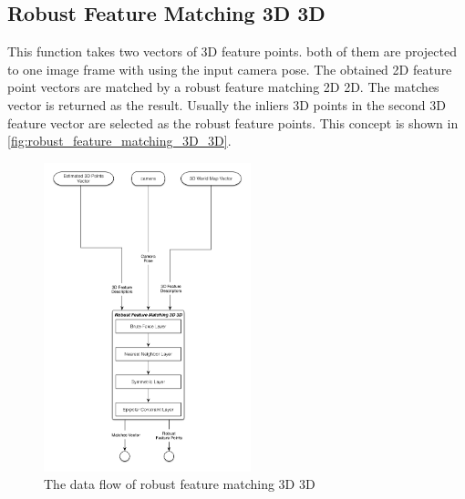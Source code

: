 \subsection {Robust Feature Matching 3D 3D} \label{subsec:robust_feature_matching_3D_3D}
This function takes two vectors of 3D feature points. both of them are projected to one image frame with using the input camera pose. The obtained 2D feature point vectors are matched by a robust feature matching 2D 2D. The matches vector is returned as the result. Usually the inliers 3D points in the second 3D feature vector are selected as the robust feature points. This concept is shown in \autoref{fig:robust_feature_matching_3D_3D}.
\begin{figure}[H]
  \centering
  \includegraphics[width=60mm]{figures/robust_feature_matching_3D_3D}
  \caption{The data flow of robust feature matching 3D 3D}\label{fig:robust_feature_matching_3D_3D}
\end{figure}

